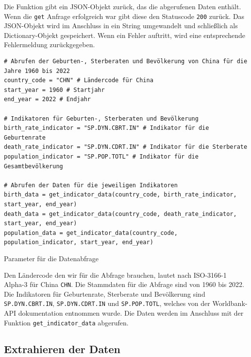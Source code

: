 Die Funktion gibt ein JSON-Objekt zurück, das die abgerufenen Daten enthält. Wenn die \texttt{get} Anfrage erfolgreich war gibt diese den Statuscode \texttt{200} zurück. Das JSON-Objekt wird im Anschluss in ein String umgewandelt und schließlich als Dictionary-Objekt gespeichert. Wenn ein Fehler auftritt, wird eine entsprechende Fehlermeldung zurückgegeben.


\begin{listing}[H]
\begin{verbatim}
# Abrufen der Geburten-, Sterberaten und Bevölkerung von China für die Jahre 1960 bis 2022
country_code = "CHN" # Ländercode für China
start_year = 1960 # Startjahr
end_year = 2022 # Endjahr

# Indikatoren für Geburten-, Sterberaten und Bevölkerung
birth_rate_indicator = "SP.DYN.CBRT.IN" # Indikator für die Geburtenrate
death_rate_indicator = "SP.DYN.CDRT.IN" # Indikator für die Sterberate
population_indicator = "SP.POP.TOTL" # Indikator für die Gesamtbevölkerung

# Abrufen der Daten für die jeweiligen Indikatoren
birth_data = get_indicator_data(country_code, birth_rate_indicator, start_year, end_year)
death_data = get_indicator_data(country_code, death_rate_indicator, start_year, end_year)
population_data = get_indicator_data(country_code, population_indicator, start_year, end_year)
\end{verbatim}
\caption{Parameter für die Datenabfrage}
\end{listing}

Den Ländercode den wir für die Abfrage brauchen, lautet nach ISO-3166-1 Alpha-3 für China \texttt{CHN}. Die Stammdaten für die Abfrage sind von 1960 bis 2022.  Die Indikatoren für Geburtenrate, Sterberate und Bevölkerung sind \texttt{SP.DYN.CBRT.IN}, \texttt{SP.DYN.CDRT.IN} und \texttt{SP.POP.TOTL}, welches von der Worldbank-API dokumentation entnommen wurde. Die Daten werden im Anschluss mit der Funktion \texttt{get\_indicator\_data} abgerufen.


\subsection{Extrahieren der Daten}

